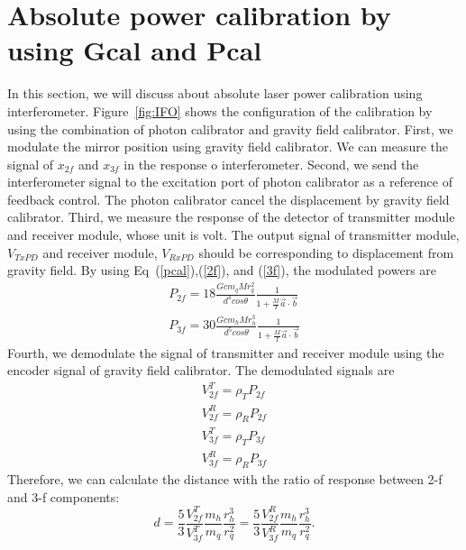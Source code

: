 \documentclass[A4]{spie}  %
\begin{document}
\section{Absolute power calibration by using Gcal and Pcal} \label{sec:PGcal}
In this section, we will discuss about absolute laser power calibration using interferometer. 
Figure~\ref{fig:IFO} shows the configuration of the calibration by using the combination of photon calibrator and gravity field calibrator.
First, we modulate the mirror position using gravity field calibrator. We can measure the signal of $x_{2f}$ and $x_{3f}$ in the response o interferometer. Second, we send the interferometer signal to the excitation port of photon calibrator as a reference of feedback control. The photon calibrator cancel the displacement by gravity field calibrator. Third, we measure the response of the detector of transmitter module and receiver module, whose unit is volt. The output signal of transmitter module, $V_{TxPD}$ and receiver module, $V_{RxPD}$ should be corresponding to displacement from gravity field. By using Eq~(\ref{pcal}),(\ref{2f}), and (\ref{3f}), the modulated powers are
\begin{eqnarray}
 P_{2f}=18 \frac{Gcm_{q}Mr_{q}^2}{d^4cos\theta}\frac{1}{1+\frac{M}{I}\vec{a}\cdot \vec{b}} \label{P2f} \\
 P_{3f}= 30\frac{Gcm_{h}Mr_{h}^3}{d^5cos\theta}\frac{1}{1+\frac{M}{I}\vec{a}\cdot \vec{b}} \label{P3f}
\end{eqnarray}
Fourth, we demodulate the signal of transmitter and receiver module using the encoder signal of gravity field calibrator.
The demodulated signals are 
\begin{eqnarray}
V_{2f}^{T}=\rho_{T}P_{2f} \\
V_{2f}^{R}=\rho_{R}P_{2f} \\
V_{3f}^{T}=\rho_{T}P_{3f} \\
V_{3f}^{R}=\rho_{R}P_{3f} 
\end{eqnarray} 
Therefore, we can calculate the distance with the ratio of response between 2-f and 3-f components: 
\begin{equation}
d=\frac{5}{3} \frac{V_{2f}^T}{V_{3f}^T}\frac{m_{h}}{m_{q}}\frac{r_{h}^{3}}{r_{q}^{2}}=\frac{5}{3} \frac{V_{2f}^R}{V_{3f}^R}\frac{m_{h}}{m_{q}}\frac{r_{h}^{3}}{r_{q}^{2}}. \label{d}
\end{equation}
\end{document}
